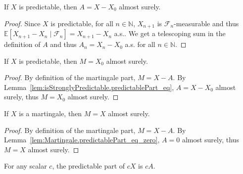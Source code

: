 \begin{lemma}\label{lem:isStronglyPredictable.predictablePart_eq}
  \mathlibok
If $X$ is predictable, then $A = X - X_0$ almost surely.
\end{lemma}

\begin{proof}\leanok
Since $X$ is predictable, for all $n \in \mathbb{N}$, $X_{n+1}$ is $\mathcal{F}_n$-measurable and thus $\mathbb{E}[X_{n+1} - X_n \mid \mathcal{F}_n] = X_{n+1} - X_n$ a.s..
We get a telescoping sum in the definition of $A$ and thus $A_n = X_n - X_0$ a.s. for all $n \in \mathbb{N}$.
\end{proof}


\begin{lemma}\label{lem:martingalePart_eq_zero}
  \mathlibok
If $X$ is predictable, then $M = X_0$ almost surely.
\end{lemma}

\begin{proof}\leanok
By definition of the martingale part, $M = X - A$. By Lemma~\ref{lem:isStronglyPredictable.predictablePart_eq}, $A = X - X_0$ almost surely, thus $M = X_0$ almost surely.
\end{proof}


\begin{lemma}\label{lem:Martingale.martingalePart_eq}
  \mathlibok
If $X$ is a martingale, then $M = X$ almost surely.
\end{lemma}

\begin{proof}\leanok
By definition of the martingale part, $M = X - A$. By Lemma~\ref{lem:Martingale.predictablePart_eq_zero}, $A = 0$ almost surely, thus $M = X$ almost surely.
\end{proof}


\begin{lemma}\label{lem:predictablePart_smul}
  \mathlibok
For any scalar $c$, the predictable part of $c X$ is $c A$.
\end{lemma}


